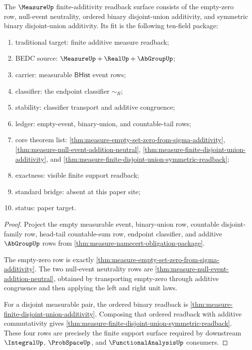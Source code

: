 \begin{theorem}
\label{thm:measure-two-step-finite-additivity-package}
The $\MeasureUp$ finite-additivity readback surface consists of the empty-zero
row, null-event neutrality, ordered binary disjoint-union additivity, and
symmetric binary disjoint-union additivity. Its fit is the following ten-field
package:
\begin{enumerate}
  \item traditional target: finite additive measure readback;
  \item BEDC source: $\MeasureUp+\RealUp+\AbGroupUp$;
  \item carrier: measurable $\mathsf{BHist}$ event rows;
  \item classifier: the endpoint classifier $\sim_R$;
  \item stability: classifier transport and additive congruence;
  \item ledger: empty-event, binary-union, and countable-tail rows;
  \item core theorem list: \autoref{thm:measure-empty-set-zero-from-sigma-additivity}, \autoref{thm:measure-null-event-addition-neutral}, \autoref{thm:measure-finite-disjoint-union-additivity}, and \autoref{thm:measure-finite-disjoint-union-symmetric-readback};
  \item exactness: visible finite support readback;
  \item standard bridge: absent at this paper site;
  \item status: paper target.
\end{enumerate}
\end{theorem}
\begin{proof}
Project the empty measurable event, binary-union row, countable disjoint-family
row, head-tail countable-sum row, endpoint classifier, and additive
$\AbGroupUp$ rows from \autoref{thm:measure-namecert-obligation-package}.

The empty-zero row is exactly
\autoref{thm:measure-empty-set-zero-from-sigma-additivity}. The two null-event
neutrality rows are \autoref{thm:measure-null-event-addition-neutral}, obtained
by transporting empty-zero through additive congruence and then applying the
left and right unit laws.

For a disjoint measurable pair, the ordered binary readback is
\autoref{thm:measure-finite-disjoint-union-additivity}. Composing that ordered
readback with additive commutativity gives
\autoref{thm:measure-finite-disjoint-union-symmetric-readback}. These four rows
are precisely the finite support surface required by downstream
$\IntegralUp$, $\ProbSpaceUp$, and $\FunctionalAnalysisUp$ consumers.
\end{proof}

